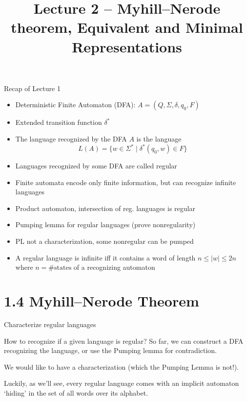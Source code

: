 \documentclass[handout]{beamer}
\title{Lecture 2 -- Myhill--Nerode theorem, Equivalent and Minimal Representations}
\begin{document}
\frame{\titlepage}


\begin{frame}{Recap of Lecture 1}

    \begin{itemize}
        \item  \alert{Deterministic Finite Automaton (DFA)}: $A=(Q,\Sigma,\delta,q_0,F)$
        \item Extended transition function $\delta^*$
        \item The language \alert{recognized} by the DFA $A$ is the language 
        $$
        L(A)=\{w\in \Sigma^* \mid \delta^*(q_0,w)\in F\}
        $$    
        \item Languages recognized by some DFA are called \alert{regular}
        \item Finite automata encode only finite information, but can recognize infinite languages
        \item Product automaton, intersection of reg. languages is regular      
        \item \alert{Pumping lemma for regular languages} (prove nonregularity)
        \item PL not a characterization, some nonregular can be pumped
        \item A regular language is infinite iff it contains a word of length $n\leq |w|\leq 2n$ where $n=\#\text{states}$ of a recognizing automaton
    \end{itemize}

\end{frame}


\section{1.4 Myhill--Nerode Theorem}


\begin{frame}{Characterize regular languages}

    How to recognize if a given language is regular? So far, we can construct a DFA recognizing the language, or use the Pumping lemma for contradiction. 
    
    We would like to have a \alert{characterization} (which the Pumping Lemma is not!).

    Luckily, as we'll see, every regular language comes with an implicit automaton `hiding' in the set of all words over its alphabet.

\end{frame}
\end{document}
